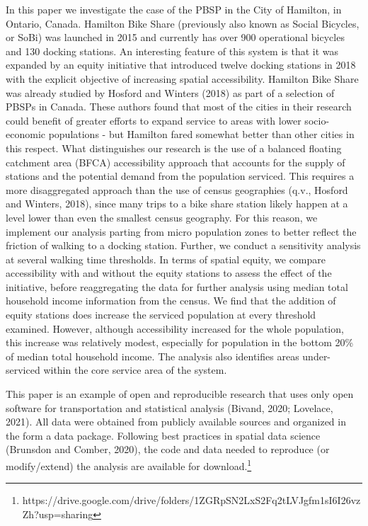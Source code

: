 \documentclass[]{elsarticle} %
\begin{document}
In this paper we investigate the case of the PBSP in the City of
Hamilton, in Ontario, Canada. Hamilton Bike Share (previously also known
as Social Bicycles, or SoBi) was launched in 2015 and currently has over
900 operational bicycles and 130 docking stations. An interesting
feature of this system is that it was expanded by an equity initiative
that introduced twelve docking stations in 2018 with the explicit
objective of increasing spatial accessibility. Hamilton Bike Share was
already studied by Hosford and Winters (2018) as part of a selection of
PBSPs in Canada. These authors found that most of the cities in their
research could benefit of greater efforts to expand service to areas
with lower socio-economic populations - but Hamilton fared somewhat
better than other cities in this respect. What distinguishes our
research is the use of a balanced floating catchment area (BFCA)
accessibility approach that accounts for the supply of stations and the
potential demand from the population serviced. This requires a more
disaggregated approach than the use of census geographies (q.v., Hosford
and Winters, 2018), since many trips to a bike share station likely
happen at a level lower than even the smallest census geography. For
this reason, we implement our analysis parting from micro population
zones to better reflect the friction of walking to a docking station.
Further, we conduct a sensitivity analysis at several walking time
thresholds. In terms of spatial equity, we compare accessibility with
and without the equity stations to assess the effect of the initiative,
before reaggregating the data for further analysis using median total
household income information from the census. We find that the addition
of equity stations does increase the serviced population at every
threshold examined. However, although accessibility increased for the
whole population, this increase was relatively modest, especially for
population in the bottom 20\% of median total household income. The
analysis also identifies areas under-serviced within the core service
area of the system.

This paper is an example of open and reproducible research that uses
only open software for transportation and statistical analysis (Bivand,
2020; Lovelace, 2021). All data were obtained from publicly available
sources and organized in the form a data package. Following best
practices in spatial data science (Brunsdon and Comber, 2020), the code
and data needed to reproduce (or modify/extend) the analysis are
available for download.\footnote{https://drive.google.com/drive/folders/1ZGRpSN2LxS2Fq2tLVJgfm1sI6I26vzZh?usp=sharing}
\end{document}
